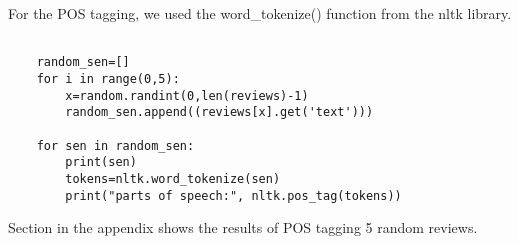 For the POS tagging, we used the word\_tokenize() function from the nltk library.

\begin{Verbatim}[fontsize=\tiny]

    random_sen=[]
    for i in range(0,5):
        x=random.randint(0,len(reviews)-1)
        random_sen.append((reviews[x].get('text')))

    for sen in random_sen:
        print(sen)
        tokens=nltk.word_tokenize(sen)
        print("parts of speech:", nltk.pos_tag(tokens))

\end{Verbatim}

Section in the appendix shows the results of POS tagging 5 random reviews.\\
